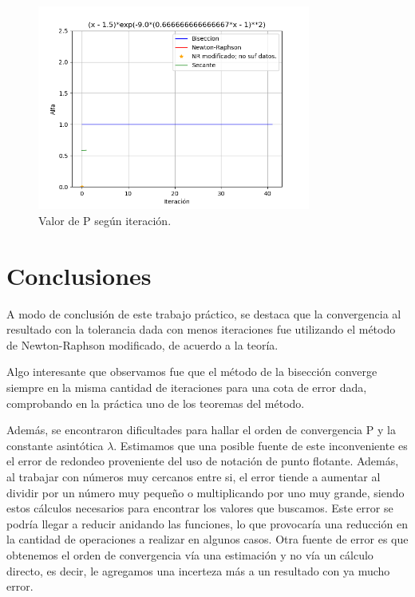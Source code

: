 \documentclass[titlepage,a4paper]{article}
\begin{document}
\begin{figure}[H]
    \centering
    \includegraphics[width=0.8\textwidth]{alfa f3.png}
    \caption{\label{fig:alfaf3}Valor de P según iteración.}
\end{figure}


\newpage

\section{Conclusiones}\label{sec:conclusiones} %

A modo de conclusión de este trabajo práctico, se destaca que la convergencia al resultado con la tolerancia dada con menos iteraciones fue utilizando el método de Newton-Raphson modificado, de acuerdo a la teoría. 

Algo interesante que observamos fue que el método de la bisección converge siempre en la misma cantidad de iteraciones para una cota de error dada, comprobando en la práctica uno de los teoremas del método.

Además, se encontraron dificultades para hallar el orden de convergencia P y la constante asintótica $\lambda$. Estimamos que una posible fuente de este inconveniente es el error de redondeo proveniente del uso de notación de punto flotante. Además, al trabajar con números muy cercanos entre si, el error tiende a aumentar al dividir por un número muy pequeño o multiplicando por uno muy grande, siendo estos cálculos necesarios para encontrar los valores que buscamos. Este error se podría llegar a reducir anidando las funciones, lo que provocaría una reducción en la cantidad de operaciones a realizar en algunos casos. 
Otra fuente de error es que obtenemos el orden de convergencia vía una estimación y no vía un cálculo directo, es decir, le agregamos una incerteza más a un resultado con ya mucho error.
\end{document}

